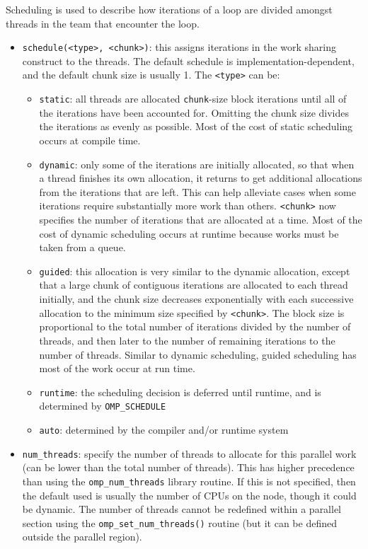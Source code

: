 \documentclass[10pt]{article}
\newcounter{subsubsubsection}[subsubsection]
\begin{document}
\begin{flushleft}
Scheduling is used to describe how iterations of a loop are divided amongst threads in the team that encounter the loop. 

\begin{itemize}
\item {\tt schedule(<type>, <chunk>)}: this assigns iterations in the work sharing construct to the threads. The default schedule is implementation-dependent, and the default chunk size is usually 1. The {\tt <type>} can be:
	\begin{itemize}
		\item {\tt static}: all threads are allocated {\tt chunk}-size block iterations until all of the iterations have been accounted for. Omitting the chunk size divides the iterations as evenly as possible. Most of the cost of static scheduling occurs at compile time.
		\item {\tt dynamic}: only some of the iterations are initially allocated, so that when a thread finishes its own allocation, it returns to get additional allocations from the iterations that are left. This can help alleviate cases when some iterations require substantially more work than others. {\tt <chunk>} now specifies the number of iterations that are allocated at a time. Most of the cost of dynamic scheduling occurs at runtime because works must be taken from a queue.
		\item {\tt guided}: this allocation is very similar to the dynamic allocation, except that a large chunk of contiguous iterations are allocated to each thread initially, and the chunk size decreases exponentially with each successive allocation to the minimum size specified by {\tt <chunk>}. The block size is proportional to the total number of iterations divided by the number of threads, and then later to the number of remaining iterations to the number of threads. Similar to dynamic scheduling, guided scheduling has most of the work occur at run time.
		\item {\tt runtime}: the scheduling decision is deferred until runtime, and is determined by {\tt OMP\_SCHEDULE}
		\item {\tt auto}: determined by the compiler and/or runtime system
	\end{itemize}
\item {\tt num\_threads}: specify the number of threads to allocate for this parallel work (can be lower than the total number of threads). This has higher precedence than using the {\tt omp\_num\_threads} library routine. If this is not specified, then the default used is usually the number of CPUs on the node, though it could be dynamic. The number of threads cannot be redefined within a parallel section using the {\tt omp\_set\_num\_threads()} routine (but it can be defined outside the parallel region). 
\end{itemize}


\end{flushleft}
\end{document}
